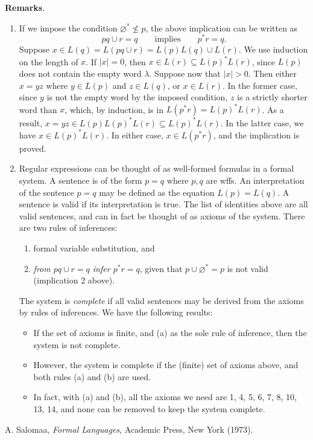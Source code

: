 \documentclass[12pt]{article}
\begin{document}
\textbf{Remarks}.
\begin{enumerate}
\item
If we impose the condition $\varnothing^* \not\le p$, the above implication can be written as 
\begin{equation}
pq\cup r= q \qquad \mbox{implies} \qquad p^*r = q.
\end{equation}
Suppose $x\in L(q)=L(pq\cup r)=L(p)L(q)\cup L(r)$.  We use induction on the length of $x$.  If $|x|=0$, then $x\in L(r)\subseteq L(p)^*L(r)$, since $L(p)$ does not contain the empty word $\lambda$.  Suppose now that $|x|>0$.  Then either $x=yz$ where $y\in L(p)$ and $z\in L(q)$, or $x\in L(r)$.  In the former case, since $y$ is not the empty word by the imposed condition, $z$ is a strictly shorter word than $x$, which, by induction, is in $L(p^*r)=L(p)^*L(r)$.  As a result, $x=yz\in L(p)L(p)^*L(r)\subseteq L(p)^*L(r)$.  In the latter case, we have $x\in L(p)^*L(r)$.  In either case, $x\in L(p^*r)$, and the implication is proved.
\item Regular expressions can be thought of as well-formed formulas in a formal system.  A sentence is of the form $p=q$ where $p,q$ are wffs.  An interpretation of the sentence $p=q$ may be defined as the equation $L(p)=L(q)$.  A sentence is valid if its interpretation is true.  The list of identities above are all valid sentences, and can in fact be thought of as axioms of the system.  There are two rules of inferences: 
\begin{enumerate}
\item formal variable substitution, and 
\item \emph{from $pq\cup r= q$ infer $p^*r = q$}, given that $p\cup \varnothing^*=p$ is not valid (implication 2 above).  
\end{enumerate}
The system is \emph{complete} if all valid sentences may be derived from the axioms by rules of inferences.  We have the following results:
\begin{itemize}
\item If the set of axioms is finite, and (a) as the sole rule of inference, then the system is not complete.
\item However, the system is complete if the (finite) set of axioms above, and both rules (a) and (b) are used.
\item In fact, with (a) and (b), all the axioms we need are 1, 4, 5, 6, 7, 8, 10, 13, 14, and none can be removed to keep the system complete.
\end{itemize}
\end{enumerate}

\begin{thebibliography}{9}
 A. Salomaa, {\em Formal Languages}, Academic Press, New York (1973).
\end{thebibliography}
\end{document}
